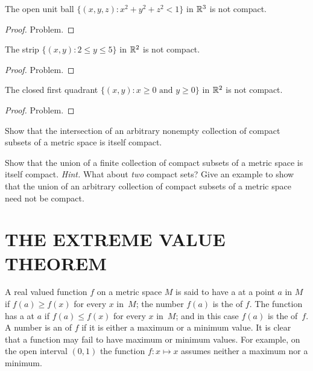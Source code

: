 \begin{exam} The open unit ball $\{(x,y,z) \colon x^2 + y^2 + z^2 < 1\}$
in $\mathbb{R}^3$ is not compact.
\end{exam}

\begin{proof} Problem.  \ns  \end{proof}

\begin{exam} The strip $\{(x,y) \colon 2 \le y \le 5\}$ in $\mathbb{R}^2$ is not
compact.
\end{exam}

\begin{proof} Problem.  \ns  \end{proof}

\begin{exam} The closed first quadrant $\{(x,y) \colon x \ge 0 \text{ and } y \ge 0\}$ in
$\mathbb{R}^2$ is not compact.
\end{exam}

\begin{proof} Problem.  \ns  \end{proof}

\begin{prob}  Show that the intersection of an arbitrary nonempty collection of compact subsets
of a metric space is itself compact.
\end{prob}

\begin{prob}  Show that the union of a finite collection of compact subsets of a metric space is
itself compact. \emph{Hint.}  What about \emph{two} compact sets?  Give an example to show
that the union of an arbitrary collection of compact subsets of a metric space need not be
compact.  \ns
\end{prob}










\section{THE EXTREME VALUE THEOREM}
\begin{defn} A real valued function $f$ on a metric space $M$ is said to have a
 at a point $a$ in $M$ if $f(a) \ge f(x)$ for every $x$ in~$M$; the
number $f(a)$ is the
 of $f$. The function has a
 at $a$ if $f(a) \le f(x)$ for every $x$ in~$M$; and in this case $f(a)$
is the
 of~$f$.  A number is an
 of $f$ if it is either a maximum or a minimum value. It is clear that a
function may fail to have maximum or minimum values.  For example, on the open interval
$(0,1)$ the function $f \colon x \mapsto x$ assumes neither a maximum nor a minimum.
\end{defn}

